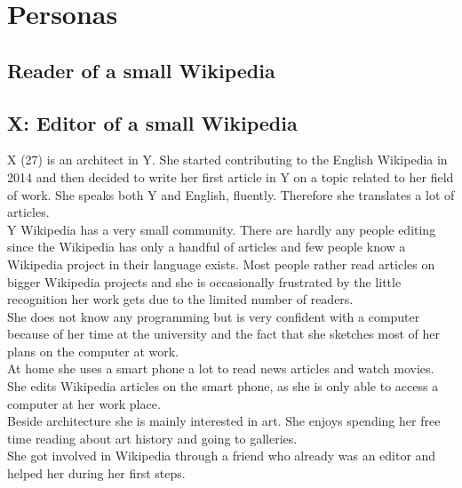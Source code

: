 \section{Personas}

\subsection{Reader of a small Wikipedia}

\subsection{X: Editor of a small Wikipedia}
X (27) is an architect in Y. She started contributing to the English Wikipedia in 2014 and then decided to write her first article in Y on a topic related to her field of work. She speaks both Y and English, fluently. Therefore she translates a lot of articles. \\
Y Wikipedia has a very small community. There are hardly any people editing since the Wikipedia has only a handful of articles and few people know a Wikipedia project in their language exists. Most people rather read articles on bigger Wikipedia projects and she is occasionally frustrated by the little recognition her work gets due to the limited number of readers. \\
She does not know any programming but is very confident with a computer because of her time at the university and the fact that she sketches most of her plans  on the computer at work. \\
At home she uses a smart phone a lot to read news articles and watch movies. She edits Wikipedia articles on the smart phone, as she is only able to access a computer at her work place. \\  
Beside architecture she is mainly interested in art. She enjoys spending her free time reading about art history and going to galleries. \\
She got involved in Wikipedia through a friend who already was an editor and helped her during her first steps.

